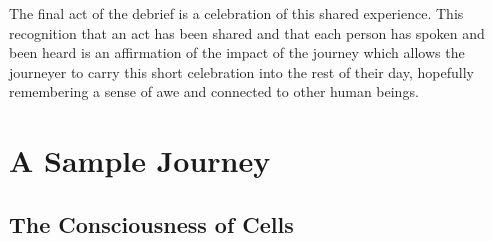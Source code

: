 \documentclass[12pt]{book}
\begin{document}
The final act of the debrief is a celebration of this shared experience.
This recognition that an act has been shared and that each person
has spoken and been heard is an affirmation of the impact of the
journey which allows the journeyer to carry this short celebration
into the rest of their day, hopefully remembering a sense of awe
and connected to other human beings.


\chapter{A Sample Journey}

\section{The Consciousness of Cells}
\end{document}
